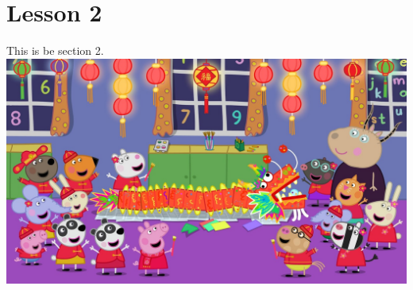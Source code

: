 \documentclass[../main.tex]{subfiles}
\begin{document}
\section{Lesson 2}

This is be section 2.\\

\includegraphics[width = \linewidth]{images/peppaPig.jpg}
\end{document}
